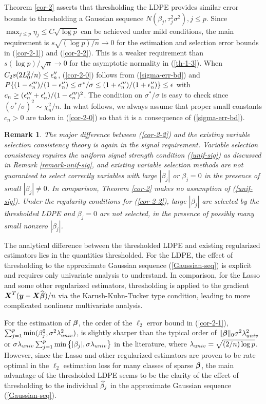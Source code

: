\documentclass[11pt]{amsart}
\newtheorem{remark}{Remark}
\begin{document}
Theorem \ref{cor-2} asserts that thresholding the LDPE provides similar error bounds to 
thresholding a Gaussian sequence $N(\beta_j,\tau_j^2\sigma^2), j\le p$. 
Since $\max_{j\le p}\eta_j\le C\sqrt{\log p}$ can be achieved %
under mild conditions, the main requirement is $s\sqrt{(\log p)/n}\to 0$ 
for the estimation and selection error bounds in (\ref{cor-2-1}) and (\ref{cor-2-2}). 
This is a weaker requirement than $s(\log p)/\sqrt{n}\to 0$ for the asymptotic normality in (\ref{th-1-3}). 
When $C_2s(2L_0^2/n)\le \epsilon_n''$, (\ref{cor-2-0}) follows from (\ref{sigma-err-bd}) and 
$P\{ (1-\epsilon_n''')/(1-\epsilon_n'') \le \sigma^*/\sigma \le (1+\epsilon_n''')/(1+\epsilon_n'')\}\le\epsilon$ with 
${c}_n\ge (\epsilon_n'''+\epsilon_n')/(1- \epsilon_n''')^2$. 
The condition on $\sigma^*/\sigma$ is easy to check since $(\sigma^*/\sigma)^2\sim \chi^2_n/n$. 
In what follows, we always assume that proper small constants ${c}_n>0$ are taken in 
(\ref{cor-2-0}) so that it is a consequence of (\ref{sigma-err-bd}).

\begin{remark}
The major difference between (\ref{cor-2-2}) and the existing variable selection consistency theory 
is again in the signal requirement.  
Variable selection consistency requires the uniform signal strength condition 
(\ref{unif-sig}) as discussed in Remark \ref{remark-unif-sig}, and 
existing variable selection methods are not guaranteed to select correctly variables 
with large $|\beta_j|$ or $\beta_j=0$ in the presence of small $|\beta_j|\neq 0$. 
In comparison, Theorem \ref{cor-2} makes no assumption of (\ref{unif-sig}). 
Under the regularity conditions for (\ref{cor-2-2}), large $|\beta_j|$ are selected by the thresholded 
LDPE and $\beta_j=0$ are not selected, in the presence of possibly many small nonzero $|\beta_j|$. 
\end{remark}

The analytical difference between the thresholded LDPE and existing regularized estimators 
lies in the quantities thresholded. 
For the LDPE, the effect of thresholding to the approximate Gaussian sequence (\ref{Gaussian-seq}) 
is explicit and requires only univariate analysis to understand. 
In comparison, for the Lasso and some other regularized estimators, thresholding is applied to 
the gradient $\boldsymbol{X}^T(\boldsymbol{y}-\boldsymbol{X}{\widehat{\boldsymbol{\beta}}})/n$ via the Karush-Kuhn-Tucker type condition, 
leading to more complicated nonlinear multivariate analysis.

For the estimation of $\boldsymbol{\beta}$, the order of the $\ell_2$ error bound in (\ref{cor-2-1}), 
$\sum_{j=1}^p \min(\beta_j^2, \sigma^2\lambda_{univ}^2)$, 
is slightly sharper than the typical order of $\|\boldsymbol{\beta}\|_0\sigma^2\lambda_{univ}^2$ or 
$\sigma\lambda_{univ}\sum_{j=1}^p \min\big\{|\beta_j|, \sigma\lambda_{univ}\big\}$ in the literature, 
where $\lambda_{univ}=\sqrt{(2/n)\log p}$. 
However, since the Lasso and other regularized estimators are proven to be rate optimal in the 
$\ell_2$ estimation loss for many classes {of} sparse $\boldsymbol{\beta}$, 
the main advantage of the thresholded LDPE seems to be the clarity of the effect of thresholding 
to the individual $\widehat{\beta}_j$ in the approximate Gaussian sequence (\ref{Gaussian-seq}).
\end{document}
